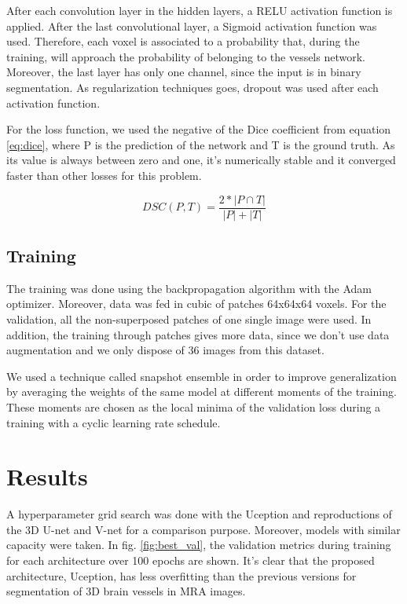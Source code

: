 \documentclass{article}
\begin{document}
After each convolution layer in the hidden layers, a RELU activation function is applied. After the last convolutional layer, a Sigmoid  activation function was used. Therefore, each voxel is associated to a probability that, during the training, will approach the probability of belonging to the vessels network. Moreover, the last layer has only one channel, since the input is in binary segmentation. As regularization techniques goes, dropout was used after each activation function. 

For the loss function, we used the negative of the Dice coefficient from equation \ref{eq:dice}, where \textsc{P} is the prediction of the network and \textsc{T} is the ground truth. As its value is always between zero and one, it's numerically stable and it converged faster than other losses for this problem.
		
\begin{equation}
\label{eq:dice}
DSC(P,T) = \frac{2*|P \cap T|}{ |P|+|T|}
\end{equation}

\subsection{Training}
The training was done using the backpropagation algorithm with the Adam optimizer. Moreover, data was fed in cubic of patches 64x64x64 voxels. For the validation, all the non-superposed patches of one single image were used. In addition, the training through patches gives more data, since we don't use data augmentation and we only dispose of 36 images from this dataset.

We used a technique called snapshot ensemble \cite{Huang2017} in order to improve generalization by averaging the weights of the same model at different moments of the training. These moments are chosen as the local minima of the validation loss during a training with a cyclic learning rate schedule.

\section{Results}

A hyperparameter grid search was done with the Uception and reproductions of the 3D U-net and V-net for a comparison purpose. Moreover, models with similar capacity were taken. In fig. \ref{fig:best_val}, the validation metrics during training for each architecture over 100 epochs are shown. It's clear that the proposed architecture, Uception, has less overfitting than the previous versions for segmentation of 3D brain vessels in MRA images.
\end{document}
